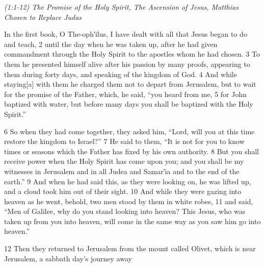 \documentclass[letterpaper]{report}
\begin{document}
{\centering
	\emph{(1:1-12) The Promise of the Holy Spirit, The Ascension of Jesus, Matthias Chosen to Replace Judas}\\
}
\begin{multicols}{2}

In the first book, O The-oph′ilus, I have dealt with all that Jesus began to do and teach, 2 until the day when he was taken up, after he had given commandment through the Holy Spirit to the apostles whom he had chosen. 3 To them he presented himself alive after his passion by many proofs, appearing to them during forty days, and speaking of the kingdom of God. 4 And while staying[a] with them he charged them not to depart from Jerusalem, but to wait for the promise of the Father, which, he said, “you heard from me, 5 for John baptized with water, but before many days you shall be baptized with the Holy Spirit.”

6 So when they had come together, they asked him, “Lord, will you at this time restore the kingdom to Israel?” 7 He said to them, “It is not for you to know times or seasons which the Father has fixed by his own authority. 8 But you shall receive power when the Holy Spirit has come upon you; and you shall be my witnesses in Jerusalem and in all Judea and Samar′ia and to the end of the earth.” 9 And when he had said this, as they were looking on, he was lifted up, and a cloud took him out of their sight. 10 And while they were gazing into heaven as he went, behold, two men stood by them in white robes, 11 and said, “Men of Galilee, why do you stand looking into heaven? This Jesus, who was taken up from you into heaven, will come in the same way as you saw him go into heaven.”

12 Then they returned to Jerusalem from the mount called Olivet, which is near Jerusalem, a sabbath day’s journey away
\end{multicols}
\end{document}
